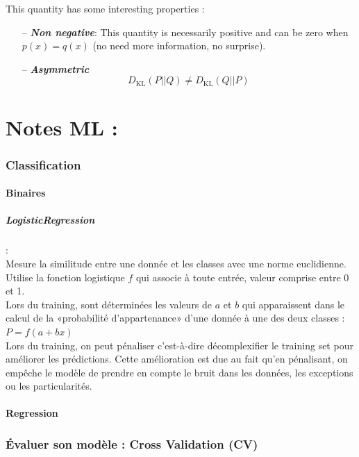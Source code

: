 \documentclass[a4paper,12pt]{report}
\newcommand{\bepar}[1]{
	\left( #1 \right)  
}
\newcommand\bk{\color{black}}
\newcommand\brick{\color{brick}}
\newcommand\navy{\color{navy}}
\newcommand{\cad}{c'est-à-dire}
\numberwithin{equation}{section} %
\begin{document}
\noindent This quantity has some interesting properties :
\begin{itemize}
 \item[--] \textit{\textbf{Non negative}}: This quantity is necessarily positive and can be zero when $p(x) = q(x)$ (no need more information, no surprise). \\[1mm]
 \item[--] \textbf{\textit{Asymmetric}}$$ D_{\text{KL}}\bepar{P||Q} \neq D_{\text{KL}}\bepar{Q||P} $$
\end{itemize}

\pagebreak

\navy \chapter{Notes ML : \cite{muller2016introduction}} \bk
\brick \subsection{Classification}\bk
\subsubsection{Binaires}
\navy \paragraph*{LogisticRegression} :\bk \\
\noindent Mesure la similitude entre une donnée et les classes avec une norme euclidienne.\\
Utilise la fonction logistique $f$ qui associe à toute entrée, valeur comprise entre 0 et 1.\\
Lors du training, sont déterminées les valeurs de $a$ et $b$ qui apparaissent dans le calcul de la «probabilité d'appartenance» d'une donnée à une des deux classes : $P = f\bepar{a+bx}$\\

\noindent Lors du training, on peut pénaliser \cad $ $ décomplexifier le training set pour améliorer les prédictions. Cette amélioration est due au fait qu'en pénalisant, on empêche le modèle de prendre en compte le bruit dans les données, les exceptions ou les particularités.
\subsubsection{Regression}
\brick \subsection{Évaluer son modèle : Cross Validation (CV)} \bk
\end{document}
